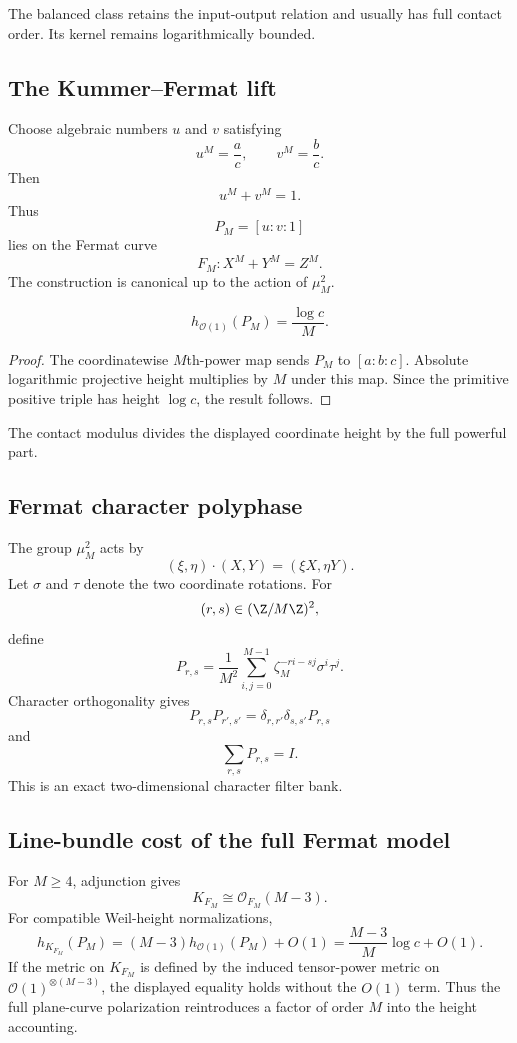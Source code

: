 The balanced class retains the input-output relation and usually has full contact order. Its kernel remains logarithmically bounded.

\subsection{The Kummer--Fermat lift}
Choose algebraic numbers $u$ and $v$ satisfying
\[
 u^M=\frac ac,
 \qquad
 v^M=\frac bc.
\]
Then
\[
 \boxed{u^M+v^M=1.}
\]
Thus
\[
 P_M=[u:v:1]
\]
lies on the Fermat curve
\[
 F_M:X^M+Y^M=Z^M.
\]
The construction is canonical up to the action of $\mu_M^2$.

\begin{theorem}
\[
 \boxed{
 h_{\mathcal O(1)}(P_M)=\frac{\log c}{M}.
 }
\]
\end{theorem}

\begin{proof}
The coordinatewise $M$th-power map sends $P_M$ to $[a:b:c]$. Absolute logarithmic projective height multiplies by $M$ under this map. Since the primitive positive triple has height $\log c$, the result follows.
\end{proof}

The contact modulus divides the displayed coordinate height by the full powerful part.

\subsection{Fermat character polyphase}
The group $\mu_M^2$ acts by
\[
 (\xi,\eta)\cdot(X,Y)=(\xi X,\eta Y).
\]
Let $\sigma$ and $\tau$ denote the two coordinate rotations. For
\[
 (r,s)\in(\Z/M\Z)^2,
\]
define
\[
 P_{r,s}
 =
 \frac1{M^2}
 \sum_{i,j=0}^{M-1}
 \zeta_M^{-ri-sj}
 \sigma^i\tau^j.
\]
Character orthogonality gives
\[
 P_{r,s}P_{r',s'}
 =
 \delta_{r,r'}\delta_{s,s'}P_{r,s}
\]
and
\[
 \boxed{
 \sum_{r,s}P_{r,s}=I.
 }
\]
This is an exact two-dimensional character filter bank.

\subsection{Line-bundle cost of the full Fermat model}
For $M\ge4$, adjunction gives
\[
 K_{F_M}\cong\mathcal O_{F_M}(M-3).
\]
For compatible Weil-height normalizations,
\[
 h_{K_{F_M}}(P_M)
 =
 (M-3)h_{\mathcal O(1)}(P_M)+O(1)
 =
 \frac{M-3}{M}\log c+O(1).
\]
If the metric on $K_{F_M}$ is defined by the induced tensor-power metric on $\mathcal O(1)^{\otimes(M-3)}$, the displayed equality holds without the $O(1)$ term. Thus the full plane-curve polarization reintroduces a factor of order $M$ into the height accounting.

